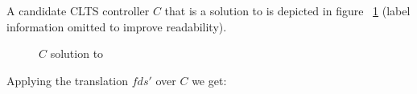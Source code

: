 A candidate CLTS controller $C$ that is a solution to \cltsCPEmbedding is depicted in figure ~\ref{fig:fds_to_clts_C} (label information omitted to improve readability).

\begin{figure}[bt]
	\centering
	\caption{$C$ solution to \cltsCPEmbedding}
	\label{fig:fds_to_clts_C}
\end{figure}

Applying the translation $fds'$ over $C$ we get:

